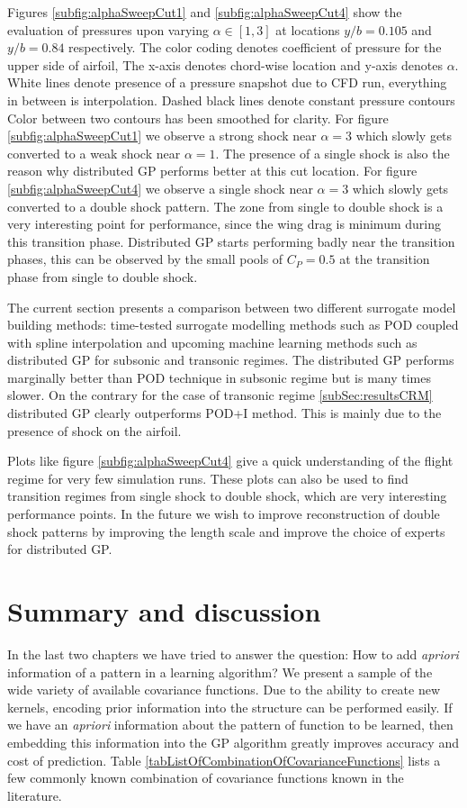 Figures \ref{subfig:alphaSweepCut1} and \ref{subfig:alphaSweepCut4} show the evaluation of pressures upon varying $\alpha \in [1, 3]$ at locations $y/b = 0.105$ and $y/b = 0.84$ respectively. The color coding denotes coefficient of pressure for the upper side of airfoil, The x-axis denotes chord-wise location and y-axis denotes $\alpha$. White lines denote presence of a pressure snapshot due to CFD run, everything in between is interpolation. Dashed black lines denote constant pressure contours Color between two contours has been smoothed for clarity. For figure \ref{subfig:alphaSweepCut1} we observe a strong shock near $\alpha = 3$ which slowly gets converted to a weak shock near $\alpha = 1$. The presence of a single shock is also the reason why distributed GP performs better at this cut location. For figure \ref{subfig:alphaSweepCut4} we observe a single shock near $\alpha = 3$ which slowly gets converted to a double shock pattern. The zone from single to double shock is a very interesting point for performance, since the wing drag is minimum during this transition phase. Distributed GP starts performing badly near the transition phases, this can be observed by the small pools of $C_{P} = 0.5$ at the transition phase from single to double shock. 

The current section presents a comparison between two different surrogate model building methods: time-tested surrogate modelling methods such as POD coupled with spline interpolation and upcoming machine learning methods such as distributed GP for subsonic and transonic regimes. The distributed GP performs marginally better than POD technique in subsonic regime but is many times slower. On the contrary for the case of transonic regime \ref{subSec:resultsCRM} distributed GP clearly outperforms POD+I method. This is mainly due to the presence of shock on the airfoil. 

Plots like figure \ref{subfig:alphaSweepCut4} give a quick understanding of the flight regime for very few simulation runs. These plots can also be used to find transition regimes from single shock to double shock, which are very interesting performance points. In the future we wish to improve reconstruction of double shock patterns by improving the length scale and improve the choice of experts for distributed GP.

\section{Summary and discussion}\label{subsec:ExpressingStructureKernelConclusion}
In the last two chapters we have tried to answer the question: How to add \textit{apriori} information of a pattern in a learning algorithm? We present a sample of the wide variety of available covariance functions. Due to the ability to create new kernels, encoding prior information into the structure can be performed easily. If we have an \textit{apriori} information about the pattern of function to be learned, then embedding this information into the GP algorithm greatly improves accuracy and cost of prediction. Table \ref{tabListOfCombinationOfCovarianceFunctions} lists a few commonly known combination of covariance functions known in the literature. 

